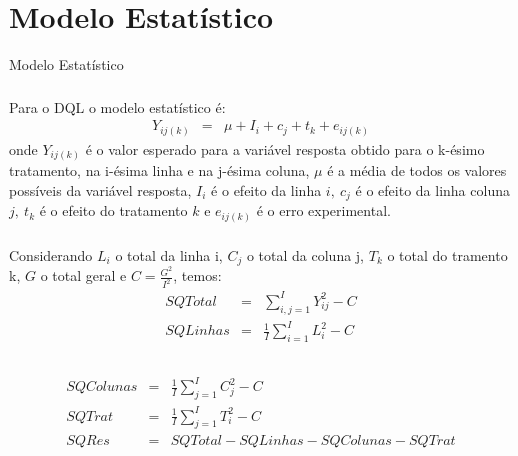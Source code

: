 \documentclass[14pt,aspectratio=1610]{beamer}
\begin{document}
\section{Modelo Estatístico}
\begin{frame}{Modelo Estatístico}
\frametitle{}
\begin{block}{}
\justifying
Para o DQL o modelo estatístico é:
\begin{eqnarray*}
Y_{ij(k)} &=& \mu + I_i + c_j + t_k + e_{ij(k)}
\end{eqnarray*}
onde $Y_{ij(k)}$ é o valor esperado para a variável resposta obtido para o k-ésimo tratamento, na i-ésima linha e na j-ésima coluna, $\mu$ é a média de todos os valores possíveis da variável resposta, $I_i$ é o efeito da linha $i,\ c_j$ é o efeito da linha coluna $j,\ t_k$ é o efeito do tratamento $k$ e $e_{ij(k)}$ é o erro experimental.
\end{block}
\end{frame}

\begin{frame}{}
\frametitle{}
\begin{block}{}
\justifying
Considerando $L_i$ o total da linha i, $C_j$ o total da coluna j, $T_k$ o total do tramento k, $G$ o total geral e $C = \frac{G^2}{I^2}$, temos:
\begin{eqnarray*}
SQTotal  &=& \sum_{i,j=1}^{I} Y_{ij}^2 - C \\
SQLinhas &=& \frac{1}{I} \sum_{i=1}^{I} L_i^2 - C \\
\end{eqnarray*}

\end{block}
\end{frame}

\begin{frame}{}
\frametitle{}
\begin{block}{}
\justifying
\begin{eqnarray*}
SQColunas &=& \frac{1}{I} \sum_{j=1}^{I} C_j^2 - C \\
SQTrat    &=& \frac{1}{I} \sum_{j=1}^{I} T_i^2 - C \\
SQRes     &=& SQTotal - SQLinhas - SQColunas - SQTrat
\end{eqnarray*}

\end{block}
\end{frame}
\end{document}
